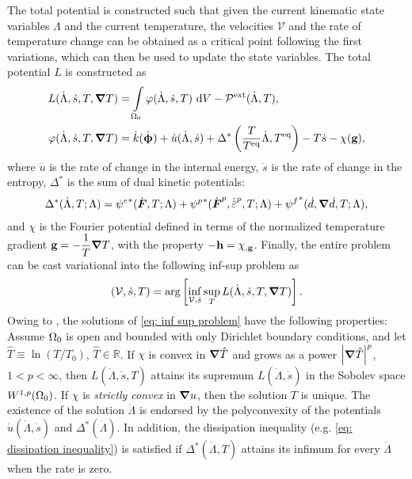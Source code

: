 The total potential is constructed such that given the current kinematic state variables $\Lambda$ and the current temperature, the velocities $\mathcal{V}$ and the rate of temperature change can be obtained as a critical point following the first variations, which can then be used to update the state variables. The total potential $L$ is constructed as
\begin{subequations}
\begin{align}
  L(\dot{\Lambda}, \dot{s}, T, \boldsymbol{\nabla} T) &= \int\limits_{\Omega_0} \varphi(\dot{\Lambda}, \dot{s}, T) \text{ d}V - \mathcal{P}^\text{ext}(\dot{\Lambda}, T), \label{eq: total potential 1}\\
  \varphi(\dot{\Lambda}, \dot{s}, T, \boldsymbol{\nabla} T) &= \dot{k}(\dot{\boldsymbol{\upphi}}) + \dot{u}(\dot{\Lambda}, \dot{s}) + \Delta^*\left( \dfrac{T}{T^\text{eq}}\dot{\Lambda}, T^\text{eq} \right) - T\dot{s} - \chi(\textbf{g}), \label{eq: local energy density}
\end{align}
\end{subequations}
where $\dot{u}$ is the rate of change in the internal energy, $\dot{s}$ is the rate of change in the entropy, $\Delta^*$ is the sum of dual kinetic potentials:
\begin{align}
    \Delta^*(\dot{\Lambda}, T; \Lambda) = {\psi^e}^*(\dot{\defgrad}, T; \Lambda) + {\psi^p}^*(\dot{\defgrad}^p, \epdot, T; \Lambda) + {\psi^f}^*(\dot{d}, \grad \dot{d}, T; \Lambda), \label{eq: dual kinetic potentials}
\end{align}
and $\chi$ is the Fourier potential defined in terms of  the normalized temperature gradient $\textbf{g} = -\dfrac{1}{T}\boldsymbol{\nabla} T$, with the property $-\textbf{h} = \chi_{,\textbf{g}}$.
Finally, the entire problem can be cast variational into the following inf-sup problem as
\begin{align}
     \left( \mathcal{V}, \dot{s}, T \right) = \arg \left[ \inf_{\mathcal{V}, \dot{s}} \sup_T L(\dot{\Lambda}, \dot{s}, T, \boldsymbol{\nabla} T) \right]. \label{eq: inf sup problem}
\end{align}
Owing to \cite{dal2012introduction,yang2006variational}, the solutions of \eqref{eq: inf sup problem} have the following properties: Assume $\Omega_0$ is open and bounded with only Dirichlet boundary conditions, and let $\hat{T} \equiv \ln(T/T_0)$, $\hat{T} \in \mathbb{R}$. If $\chi$ is convex in $\boldsymbol{\nabla} \hat{T}$ and grows as a power $\left\vert{\boldsymbol{\nabla}\hat{T}}\right\vert^p$, $1 < p < \infty$, then $L(\dot{\Lambda}, \dot{s}, T)$ attains its supremum $L(\dot{\Lambda}, \dot{s})$ in the Sobolev space $W^{1,p}(\Omega_0)$. If $\chi$ is \emph{strictly convex} in $\boldsymbol{\nabla} u$, then the solution $T$ is unique. The existence of the solution $\dot{\Lambda}$ is endorsed by the polyconvexity of the potentials $\dot{u}(\dot{\Lambda}, \dot{s})$ and $\Delta^*(\dot{\Lambda})$. In addition, the dissipation inequality (e.g. \eqref{eq: dissipation inequality}) is satisfied if $\Delta^*(\dot{\Lambda}, T)$ attains its infimum for every $\dot{\Lambda}$ when the rate is zero.

